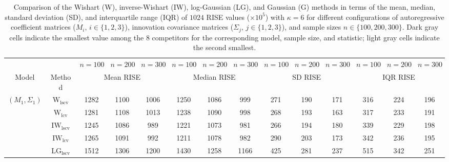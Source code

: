 \begin{table}[!ht]
\caption{Comparison of the Wishart (W), inverse-Wishart (IW), log-Gaussian (LG), and Gaussian (G) methods in terms of the mean, median, standard deviation (SD), and interquartile range (IQR) of $1024$ RISE values ($\times 10^5$) with $\kappa = 6$ for different configurations of autoregressive coefficient matrices ($M_i, \, i\in \{1,2,3\}$), innovation covariance matrices ($\Sigma_j, \, j\in \{1,2,3\}$), and sample sizes $n \in \{100, 200, 300\}$. Dark gray cells indicate the smallest value among the 8 competitors for the corresponding model, sample size, and statistic; light gray cells indicate the second smallest.}
\label{tab:summary}

\fontsize{7.9}{7}\selectfont\renewcommand{\arraystretch}{0}
\setlength{\tabcolsep}{1.2pt}
\setlength{\aboverulesep}{0.35ex}
\setlength{\belowrulesep}{0.35ex}
\centering
{
\begin{tabular}{@{}cc|ccc|ccc|ccc|ccc@{}}
\toprule
\multicolumn{2}{c|}{} & $n = 100$ & $n = 200$ & $n = 300$ & $n = 100$ & $n = 200$ & $n = 300$ & $n = 100$ & $n = 200$ & $n = 300$ & $n = 100$ & $n = 200$ & $n = 300$ \\
\cmidrule(r){1-2}\cmidrule(lr){3-5}\cmidrule(lr){6-8}\cmidrule(lr){9-11}\cmidrule(l){12-14}
Model & Method & \multicolumn{3}{c|}{Mean RISE} & \multicolumn{3}{c|}{Median RISE} & \multicolumn{3}{c|}{SD RISE} & \multicolumn{3}{c}{IQR RISE} \\
\midrule
$(M_1,\Sigma_1)$ & $\mathrm{W}_{\mathrm{lscv}}$ & 1282 & 1100 & 1006 & 1250 & 1086 & 999 & 271 & 190 & 171 & 316 & \cellcolor{black!10}224 & 196 \\ 
 & $\mathrm{W}_{\mathrm{lcv}}$ & 1281 & 1108 & 1013 & 1238 & 1090 & 998 & 268 & 193 & \cellcolor{black!10}163 & 317 & 233 & \cellcolor{black!30}191 \\ 
 & $\mathrm{IW}_{\mathrm{lscv}}$ & \cellcolor{black!30}1245 & \cellcolor{black!30}1086 & \cellcolor{black!30}989 & \cellcolor{black!10}1221 & \cellcolor{black!30}1073 & \cellcolor{black!30}981 & 266 & 194 & 180 & 339 & 229 & 198 \\ 
 & $\mathrm{IW}_{\mathrm{lcv}}$ & \cellcolor{black!10}1265 & \cellcolor{black!10}1091 & \cellcolor{black!10}992 & \cellcolor{black!30}1211 & \cellcolor{black!10}1078 & \cellcolor{black!10}982 & 290 & 203 & 173 & 342 & 236 & \cellcolor{black!10}195 \\ 
 & $\mathrm{LG}_{\mathrm{lscv}}$ & 1512 & 1306 & 1200 & 1430 & 1258 & 1166 & 425 & 281 & 237 & 515 & 342 & 251 \\ 

\end{tabular}}
\end{table}
